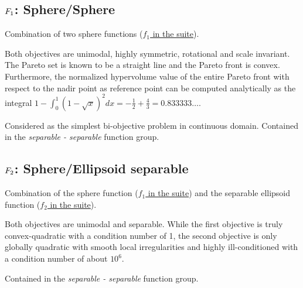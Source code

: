 
\subsection[\texorpdfstring{\protect\(F_1\protect\): Sphere/Sphere}{F1: Sphere/Sphere}]{\texorpdfstring{\protect\(F_1\protect\): Sphere/Sphere}{}}
\label{index:f1}\label{index:sphere-sphere}
Combination of two sphere functions (\href{https://coco.gforge.inria.fr/downloads/download16.00/bbobdocfunctions.pdf\#page=5}{\(f_1\) in the \bbob suite}).

\noindent Both objectives are unimodal, highly symmetric, rotational and scale
invariant. The Pareto set is known to be a straight line and the Pareto
front is convex. Furthermore, the normalized hypervolume value of the
entire Pareto front with respect to the nadir point as reference point
can be computed analytically as the integral
\(1-\int_{0}^{1} (1-\sqrt{x})^2dx = -\frac{1}{2}+\frac{4}{3}=0.833333\ldots\).

Considered as the simplest bi-objective problem in
continuous domain.
%
Contained in the \emph{separable - separable} function group.



\subsection[\texorpdfstring{\protect\(F_2\protect\): Sphere/Ellipsoid separable}{F2: Sphere/Ellipsoid separable}]{\texorpdfstring{\protect\(F_2\protect\): Sphere/Ellipsoid separable}{}}
\label{index:f2}\label{index:sphere-ellipsoid-separable}
Combination of the sphere function (\href{https://coco.gforge.inria.fr/downloads/download16.00/bbobdocfunctions.pdf\#page=5}{\(f_1\) in the \bbob suite})
and the separable ellipsoid function (\href{https://coco.gforge.inria.fr/downloads/download16.00/bbobdocfunctions.pdf\#page=10}{\(f_2\) in the \bbob suite}).

Both objectives are unimodal and separable. While the first objective is
truly convex-quadratic with a condition number of 1, the second
objective is only globally quadratic with smooth local
irregularities and highly ill-conditioned with a condition number of
about \(10^6\).

Contained in the \emph{separable - separable} function group.



